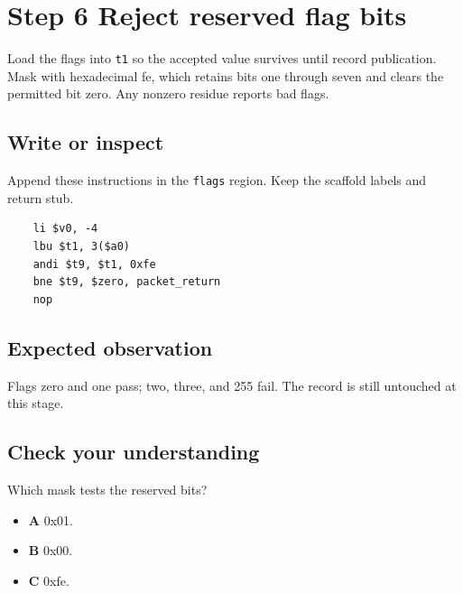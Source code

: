 \section{Step 6 Reject reserved flag bits}\label{packet-s06}

Load the flags into \texttt{t1} so the accepted value survives until record publication. Mask with hexadecimal fe, which retains bits one through seven and clears the permitted bit zero. Any nonzero residue reports bad flags.

\subsection{Write or inspect}
Append these instructions in the \texttt{flags} region. Keep the scaffold labels and return stub.

\begin{verbatim}
    li $v0, -4
    lbu $t1, 3($a0)
    andi $t9, $t1, 0xfe
    bne $t9, $zero, packet_return
    nop
\end{verbatim}

\subsection{Expected observation}
Flags zero and one pass; two, three, and 255 fail. The record is still untouched at this stage.

\subsection{Check your understanding}
Which mask tests the reserved bits?

\begin{itemize}
  \item \textbf{A} 0x01.
  \item \textbf{B} 0x00.
  \item \textbf{C} 0xfe.
\end{itemize}
